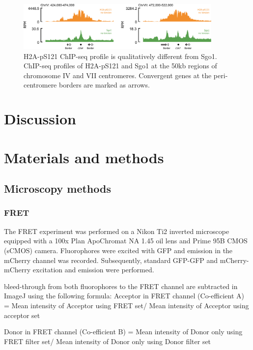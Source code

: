 \begin{figure}[htbp]
  \centering
  \includegraphics[width=0.9\textwidth]{chapter3/figures/Sgo1 comparison.pdf}
  \caption[H2A-pS121 ChIP-seq profile is qualitatively different from Sgo1]{H2A-pS121 ChIP-seq profile is qualitatively different from Sgo1. ChIP-seq profiles of H2A-pS121 and Sgo1 \citep{Paldi2020ConvergentPericentromeres} at the 50kb regions of chromosome IV and VII centromeres. Convergent genes at the peri-centromere borders are marked as arrows. }
  \label{fig:sgo1comparison}
\end{figure}



\section{Discussion}
\section{Materials and methods}
\subsection{Microscopy methods}
\subsubsection{FRET}
The FRET experiment was performed on a Nikon Ti2 inverted microscope equipped with a 100x Plan ApoChromat NA 1.45 oil lens and Prime 95B CMOS (sCMOS) camera. Fluorophores were excited with GFP and emission in the mCherry channel was recorded. Subsequently, standard GFP-GFP and mCherry-mCherry excitation and emission were performed. 

bleed-through from both fluorophores to the FRET channel are subtracted in ImageJ using the following formula: 
Acceptor in FRET channel (Co-efficient A) =	Mean intensity of Acceptor using FRET set/ Mean intensity of Acceptor using acceptor set

Donor in FRET channel (Co-efficient B) = Mean intensity of Donor only using FRET filter set/ Mean intensity of Donor only using Donor filter set

